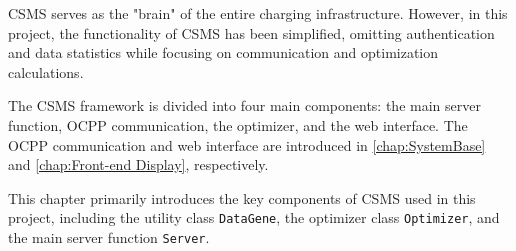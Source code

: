 \documentclass[
english,
ruledheaders=section,%
class=report,%
thesis={type=Report},%
accentcolor=9c,%
custommargins=true,%
marginpar=false,%
parskip=half-,%
fontsize=11pt,%
logofile={img/tuda_logo.pdf}, %
]{tudapub}
\begin{document}
    CSMS serves as the "brain" of the entire charging infrastructure. However, in this project, the functionality of CSMS has been simplified, omitting authentication and data statistics while focusing on communication and optimization calculations.

    The CSMS framework is divided into four main components: the main server function, OCPP communication, the optimizer, and the web interface. The OCPP communication and web interface are introduced in \autoref{chap:SystemBase} and \autoref{chap:Front-end Display}, respectively.

    This chapter primarily introduces the key components of CSMS used in this project, including the utility class \texttt{DataGene}, the optimizer class \texttt{Optimizer}, and the main server function \texttt{Server}.

\end{document}
